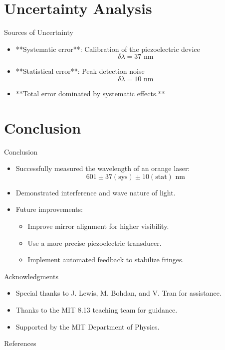 \documentclass[aspectratio = 169]{beamer}
\begin{document}
\section{Uncertainty Analysis}
\begin{frame}{Sources of Uncertainty}
    \begin{itemize}
        \item **Systematic error**: Calibration of the piezoelectric device
        \[
        \delta \lambda = 37 \text{ nm}
        \]
        \item **Statistical error**: Peak detection noise
        \[
        \delta \lambda = 10 \text{ nm}
        \]
        \item **Total error dominated by systematic effects.**
    \end{itemize}
\end{frame}

\section{Conclusion}
\begin{frame}{Conclusion}
    \begin{itemize}
        \item Successfully measured the wavelength of an orange laser:
        \[
        601\pm37(\text{sys})\pm10(\text{stat})\text{ nm}
        \]
        \item Demonstrated interference and wave nature of light.
        \item Future improvements:
        \begin{itemize}
            \item Improve mirror alignment for higher visibility.
            \item Use a more precise piezoelectric transducer.
            \item Implement automated feedback to stabilize fringes.
        \end{itemize}
    \end{itemize}
\end{frame}

\begin{frame}{Acknowledgments}
    \begin{itemize}
        \item Special thanks to J. Lewis, M. Bohdan, and V. Tran for assistance.
        \item Thanks to the MIT 8.13 teaching team for guidance.
        \item Supported by the MIT Department of Physics.
    \end{itemize}
\end{frame}

\begin{frame}[allowframebreaks]{References}
    
    
\end{frame}
\end{document}
